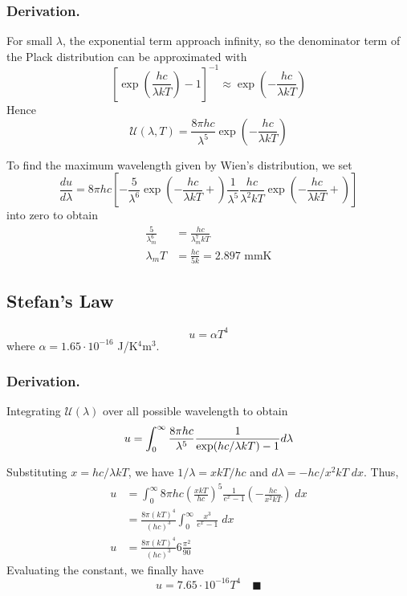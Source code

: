 \documentclass[../../../Main.tex]{subfiles}
\begin{document}
\subsubsection*{Derivation.} For small $\lambda$, the exponential term approach infinity, so the denominator term of the Plack distribution can be approximated with
\begin{equation*}
    \left[\exp\left(\frac{hc}{\lambda kT}\right)-1\right]^{-1}\approx \exp\left(-\frac{hc}{\lambda kT}\right)
\end{equation*}
Hence 
\begin{equation*}
    \mathcal{U}(\lambda,T)=\frac{8\pi hc}{\lambda^5}\exp\left(-\frac{hc}{\lambda kT}\right)
\end{equation*}

To find the maximum wavelength given by Wien's distribution, we set 
\begin{equation*}
    \frac{du}{d\lambda}=8\pi hc\left[-\frac{5}{\lambda^6}\exp\left( -\frac{hc}{\lambda kT}+\right)\frac{1}{\lambda^5}\frac{hc}{\lambda^2kT}\exp\left( -\frac{hc}{\lambda kT}+\right)\right]
\end{equation*}
into zero to obtain
\begin{align*}
    \frac{5}{\lambda_m^6}&=\frac{hc}{\lambda_m^7kT}\\
    \lambda_m T&=\frac{hc}{5k}=2.897 \text{ mmK}
\end{align*}


\subsection*{Stefan's Law}
\begin{equation*}
    u=\alpha T^4
\end{equation*}
where $\alpha=1.65\cdot10^{-16}$ J/K$^{4}$m$^{3}$.

\subsubsection*{Derivation.} Integrating $\mathcal{U}(\lambda)$ over all possible wavelength to obtain
\begin{equation*}
    u=\int_0^\infty\frac{8\pi hc}{\lambda^5}\frac{1}{\exp(hc/\lambda k T)-1}d\lambda\\
\end{equation*}

Substituting $x=hc/\lambda kT$, we have $1/\lambda=xkT/hc$ and $d\lambda=-hc/x^2kT\;dx$. Thus,
\begin{align*}
    u&=\int_0^\infty 8\pi hc \left(\frac{xkT}{hc}\right)^5\frac{1}{e^x-1}\left(-\frac{hc}{x^2kT}\right)\;dx\\
    &=\frac{8\pi (kT)^4}{(hc)^3}\int_{0}^{\infty}\frac{x^3}{e^x-1}\;dx\\
    u&=\frac{8\pi (kT)^4}{(hc)^3}6\frac{\pi^2}{90}
\end{align*}
Evaluating the constant, we finally have 
\begin{equation*}
    u=7.65\cdot10^{-16} T^4\quad\blacksquare
\end{equation*}
\end{document}
